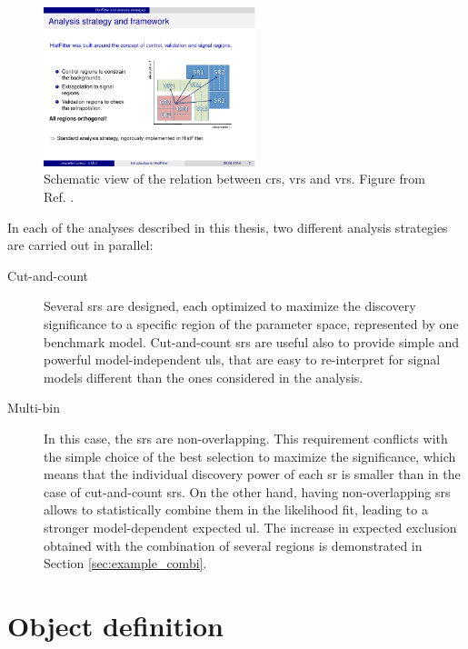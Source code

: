 \begin{figure}
\centering
\includegraphics[width=0.55\textwidth]{figures/susy_common/CR_VR}
\caption{Schematic view of the relation between \glspl{cr}, \glspl{vr} and \glspl{vr}. Figure from Ref. \cite{Baak:2014wma}.}
\label{fig:susy_common:CRschema}
\end{figure}
 
In each of the analyses described in this thesis, two different analysis strategies are carried out in parallel:
\begin{description}
\item[Cut-and-count] Several \glspl{sr} are designed, each optimized to maximize the discovery significance to a specific region of the parameter  space, represented by one benchmark model. Cut-and-count \glspl{sr} are useful also to provide simple and powerful model-independent \glspl{ul}, that are easy to re-interpret for signal models different than the ones considered in the analysis. 

\item[Multi-bin] In this case, the \glspl{sr} are non-overlapping. This requirement conflicts with the simple choice of the best selection to maximize the significance, which means that the individual discovery power of each \gls{sr} is smaller than in the case of cut-and-count \glspl{sr}. On the other hand, having non-overlapping \glspl{sr} allows to statistically combine them in the likelihood fit, leading to a stronger model-dependent expected \gls{ul}. The increase in expected exclusion obtained with the combination of several regions is demonstrated in Section \ref{sec:example_combi}.
 
\end{description}


\section{Object definition}
\label{sec:common_obj_def}

